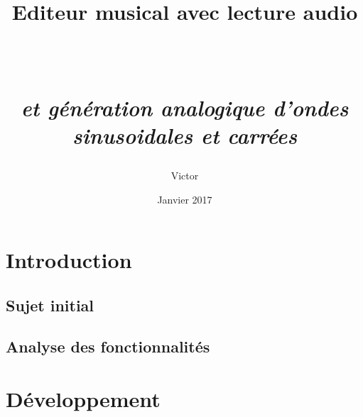 \documentclass[12pt]{report}
\begin{document}
\title{\begin{Huge}Editeur musical avec lecture audio\end{Huge} \\
    \begin{normalsize}\textit{et génération analogique d'ondes sinusoidales et carrées}\end{normalsize}
    }
\author{Victor }
\date{Janvier 2017}
 
\maketitle

\tableofcontents

\chapter{Introduction}
\section{Sujet initial}
\section{Analyse des fonctionnalités} %

\chapter{Développement} %
\end{document}
